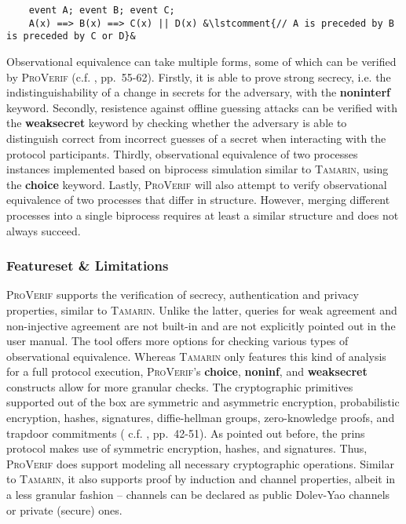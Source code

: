 \begin{lstlisting}
    event A; event B; event C;
    A(x) ==> B(x) ==> C(x) || D(x) &\lstcomment{// A is preceded by B is preceded by C or D}&
\end{lstlisting}

Observational equivalence can take multiple forms, some of which can be verified by \textsc{ProVerif} (c.f. \cite{blanchet2020proverif}, pp.~55-62).
Firstly, it is able to prove strong secrecy, i.e. the indistinguishability of a change in secrets for the adversary, with the \textsf{\textbf{noninterf}} keyword.
Secondly, resistence against offline guessing attacks can be verified with the \textsf{\textbf{weaksecret}} keyword by checking whether the adversary is able to distinguish correct from incorrect guesses of a secret when interacting with the protocol participants.
Thirdly, observational equivalence of two processes instances implemented based on biprocess simulation similar to \textsc{Tamarin}, using the \textsf{\textbf{choice}} keyword.
Lastly, \textsc{ProVerif} will also attempt to verify observational equivalence of two processes that differ in structure.
However, merging different processes into a single biprocess requires at least a similar structure and does not always succeed.

\subsubsection{Featureset \& Limitations}

\textsc{ProVerif} supports the verification of secrecy, authentication and privacy properties, similar to \textsc{Tamarin}.
Unlike the latter, queries for weak agreement and non-injective agreement are not built-in and are not explicitly pointed out in the user manual.
The tool offers more options for checking various types of observational equivalence.
Whereas \textsc{Tamarin} only features this kind of analysis for a full protocol execution, \textsc{ProVerif}'s \textbf{choice}, \textbf{noninf}, and \textbf{weaksecret} constructs allow for more granular checks.
The cryptographic primitives supported out of the box are symmetric and asymmetric encryption, probabilistic encryption, hashes, signatures, diffie-hellman groups,
zero-knowledge proofs, and trapdoor commitments ( c.f. \cite{blanchet2020proverif}, pp.~42-51).
As pointed out before, the \gls{prins} protocol makes use of symmetric encryption, hashes, and signatures.
Thus, \textsc{ProVerif} does support modeling all necessary cryptographic operations.
Similar to \textsc{Tamarin}, it also supports proof by induction and channel properties, albeit in a less granular fashion -- channels can be declared as public Dolev-Yao channels or private (secure) ones.

